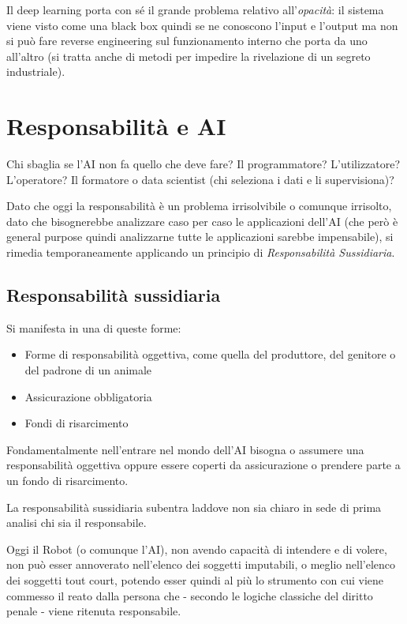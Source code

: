 Il deep learning porta con sé il grande problema relativo all'\textit{opacità}: il sistema viene visto come una black box quindi se ne conoscono l'input e l'output ma non si può fare reverse engineering sul funzionamento interno che porta da uno all'altro (si tratta anche di metodi per impedire la rivelazione di un segreto industriale). 

\section{Responsabilità e AI}
Chi sbaglia se l'AI non fa quello che deve fare? Il programmatore? L'utilizzatore? L'operatore? Il formatore o data scientist (chi seleziona i dati e li supervisiona)?

Dato che oggi la responsabilità è un problema irrisolvibile o comunque irrisolto, dato che bisognerebbe analizzare caso per caso le applicazioni dell'AI (che però è general purpose quindi analizzarne tutte le applicazioni sarebbe impensabile), si rimedia temporaneamente applicando un principio di \textit{Responsabilità Sussidiaria}.

\subsection{Responsabilità sussidiaria}
Si manifesta in una di queste forme:
\begin{itemize}
    \item Forme di responsabilità oggettiva, come quella del produttore, del genitore o del padrone di un animale
    \item Assicurazione obbligatoria
    \item Fondi di risarcimento
\end{itemize} 
Fondamentalmente nell'entrare nel mondo dell'AI bisogna o assumere una responsabilità oggettiva oppure essere coperti da assicurazione o prendere parte a un fondo di risarcimento.

La responsabilità sussidiaria subentra laddove non sia chiaro in sede di prima analisi chi sia il responsabile.

Oggi il Robot (o comunque l’AI), non avendo capacità di intendere e di volere, non può esser annoverato nell’elenco dei soggetti imputabili, o meglio nell’elenco dei soggetti tout court, potendo esser quindi al più lo strumento con cui viene commesso il reato dalla persona che - secondo le logiche classiche del diritto penale - viene ritenuta
responsabile.

